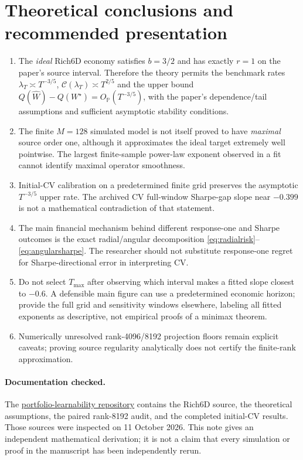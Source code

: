 \documentclass[11pt,a4paper]{article}
\theoremstyle{remark}
\begin{document}
\section{Theoretical conclusions and recommended presentation}
\begin{enumerate}[leftmargin=*,itemsep=.4em]
\item The \emph{ideal} Rich6D economy satisfies $b=3/2$ and has exactly $r=1$ on the paper's source interval. Therefore the theory permits the benchmark rates $\lambda_T\asymp T^{-3/5}$, $\mathcal C(\lambda_T)\asymp T^{2/5}$ and the upper bound $Q(\widehat W)-Q(W^\star)=O_{\mathbb P}(T^{-3/5})$, with the paper's dependence/tail assumptions and sufficient asymptotic stability conditions.
\item The finite $M=128$ simulated model is not itself proved to have \emph{maximal} source order one, although it approximates the ideal target extremely well pointwise. The largest finite-sample power-law exponent observed in a fit cannot identify maximal operator smoothness.
\item Initial-CV calibration on a predetermined finite grid preserves the asymptotic $T^{-3/5}$ upper rate. The archived CV full-window Sharpe-gap slope near $-0.399$ is not a mathematical contradiction of that statement.
\item The main financial mechanism behind different response-one and Sharpe outcomes is the exact radial/angular decomposition \eqref{eq:radialrisk}--\eqref{eq:angularsharpe}. The researcher should not substitute response-one regret for Sharpe-directional error in interpreting CV.
\item Do not select $T_{\max}$ after observing which interval makes a fitted slope closest to $-0.6$. A defensible main figure can use a predetermined economic horizon; provide the full grid and sensitivity windows elsewhere, labeling all fitted exponents as descriptive, not empirical proofs of a minimax theorem.
\item Numerically unresolved rank-4096/8192 projection floors remain explicit caveats; proving source regularity analytically does not certify the finite-rank approximation.
\end{enumerate}

\paragraph{Documentation checked.}
The \href{https://github.com/ENRICOBIGNOZZI/portfolio_learnability}{portfolio-learnability repository}
contains the Rich6D source, the theoretical assumptions, the paired rank-8192 audit,
and the completed initial-CV results. Those sources were inspected on 11 October 2026.
This note gives an independent mathematical derivation; it is not a claim
that every simulation or proof in the manuscript has been independently rerun.
\end{document}
